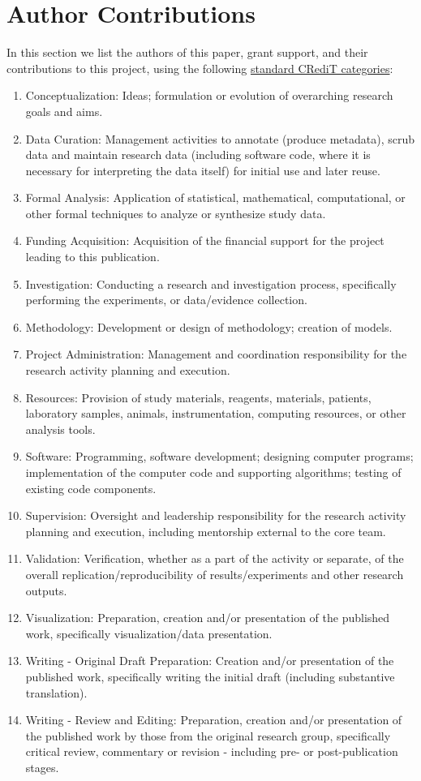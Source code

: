 \section{Author Contributions}

In this section we list the authors of this paper, grant support, and their contributions to this project, using the following \href{https://credit.niso.org/}{standard CRediT categories}:

\begin{enumerate}
    \item Conceptualization: Ideas; formulation or evolution of overarching research goals and aims.
    \item Data Curation: Management activities to annotate (produce metadata), scrub data and maintain research data (including software code, where it is necessary for interpreting the data itself) for initial use and later reuse.
    \item Formal Analysis: Application of statistical, mathematical, computational, or other formal techniques to analyze or synthesize study data.
    \item Funding Acquisition: Acquisition of the financial support for the project leading to this publication.
    \item Investigation: Conducting a research and investigation process, specifically performing the experiments, or data/evidence collection.
    \item Methodology: Development or design of methodology; creation of models.
    \item Project Administration: Management and coordination responsibility for the research activity planning and execution.
    \item Resources: Provision of study materials, reagents, materials, patients, laboratory samples, animals, instrumentation, computing resources, or other analysis tools.
    \item Software: Programming, software development; designing computer programs; implementation of the computer code and supporting algorithms; testing of existing code components.
    \item Supervision: Oversight and leadership responsibility for the research activity planning and execution, including mentorship external to the core team.
    \item Validation: Verification, whether as a part of the activity or separate, of the overall replication/reproducibility of results/experiments and other research outputs.
    \item Visualization: Preparation, creation and/or presentation of the published work, specifically visualization/data presentation.
    \item Writing - Original Draft Preparation: Creation and/or presentation of the published work, specifically writing the initial draft (including substantive translation).
    \item Writing - Review and Editing: Preparation, creation and/or presentation of the published work by those from the original research group, specifically critical review, commentary or revision - including pre- or post-publication stages.
\end{enumerate}

